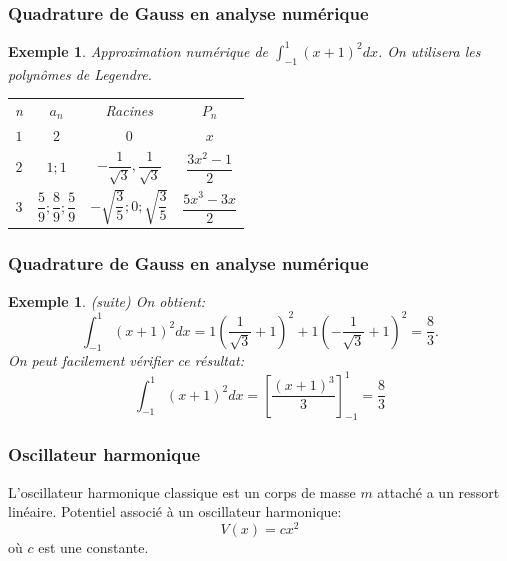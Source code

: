 \documentclass[xcolor=dvipsnames,10pt,mathserif]{beamer}
\theoremstyle{plain}
\newtheorem{ex}[thm]{Exemple}
\begin{document}
  
\begin{frame} \frametitle{Quadrature de Gauss en analyse numérique \hfill \insertpagenumber}

\begin{ex}
Approximation numérique de $\displaystyle{\int_{-1}^1{(x+1)^2dx}}$.
On utilisera les polynômes de Legendre.

\pause

\begin{center}
\begin{tabular}{cccc}
n & $a_n$ & Racines & $P_n$ \\
$1$ & $2$ & $0$ & $x$ \\
$2$ & $1;1$ & $-\dfrac{1}{\sqrt{3}},\dfrac{1}{\sqrt{3}}$ & $\dfrac{3x^2-1}{2}$\\
$3$ & $\dfrac{5}{9};\dfrac{8}{9};\dfrac{5}{9}$ & $-\sqrt{\dfrac{3}{5}};0;\sqrt{\dfrac{3}{5}}$ & $\dfrac{5x^3-3x}{2}$\\
\end{tabular}
\end{center}
\end{ex}

\end{frame}
  
\begin{frame} \frametitle{Quadrature de Gauss en analyse numérique \hfill \insertpagenumber}

\begin{ex}{(suite)}
  On obtient:
  $$\int_{-1}^1{(x+1)^2dx}=1\left(\dfrac{1}{\sqrt{3}}+1\right)^2+1\left(-\dfrac{1}{\sqrt{3}}+1\right)^2=\dfrac{8}{3}.$$
On peut facilement vérifier ce résultat:
$$\int_{-1}^1{(x+1)^2dx}=\left[\dfrac{(x+1)^3}{3}\right]^1_{-1}=\dfrac{8}{3}$$
\end{ex}
 
 \end{frame} 
\begin{frame} \frametitle{Oscillateur harmonique \hfill \insertpagenumber}
\begin{block}{}
L'oscillateur harmonique classique est un corps de masse $m$ attaché a un ressort linéaire.
Potentiel associé à un oscillateur harmonique:
\begin{equation}
V(x)=cx^2
\end{equation}
où $c$ est une constante.
\end{block}
 
\end{frame} 
 
\end{document}
